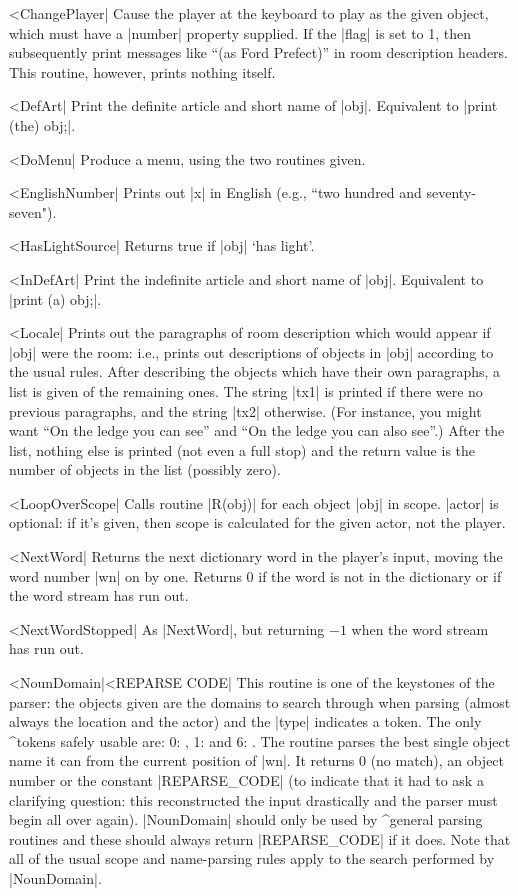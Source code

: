 ^^|ChangePlayer|
Cause the player at the keyboard to
play as the given object, which must have a |number| property supplied.  If
the |flag| is set to 1, then subsequently print messages like ``(as Ford
Prefect)'' in room description headers.  This routine, however, prints nothing
itself.

^^|DefArt|
Print the definite article and short name of
|obj|.  Equivalent to |print (the) obj;|.

^^|DoMenu|
Produce a menu, using the two routines given.

^^|EnglishNumber|
Prints out |x| in English (e.g., ``two hundred and seventy-seven").

^^|HasLightSource|
Returns true if |obj| `has light'.

^^|InDefArt|
Print the indefinite article and short name
of |obj|.  Equivalent to |print (a) obj;|.

^^|Locale|
Prints out the paragraphs of room description which would appear
if |obj| were the room: i.e., prints out descriptions of objects
in |obj| according to the usual rules.  After describing the
objects which have their own paragraphs, a list is given of
the remaining ones.  The string |tx1| is printed if there were
no previous paragraphs, and the string |tx2| otherwise.
(For instance, you might want ``On the ledge you can see''
and ``On the ledge you can also see''.)  After the list, nothing
else is printed (not even a full stop) and the return value is
the number of objects in the list (possibly zero).

^^|LoopOverScope|
Calls routine |R(obj)| for each object |obj| in scope.  |actor|
is optional: if it's given, then scope is calculated for the
given actor, not the player.

^^|NextWord|
Returns the next dictionary word in the player's
input, moving the word number |wn| on by one.  Returns 0
if the word is not in the dictionary or if the word stream has
run out.

^^|NextWordStopped|
As |NextWord|, but returning $-1$ when the word stream has run out.

^^|NounDomain|^^|REPARSE CODE|
This routine is one of the keystones of the parser: the objects
given are the domains to search through when parsing (almost
always the location and the actor) and the |type| indicates a
token.  The only ^{tokens} safely usable are: 0: ,
1:  and 6: .  The routine parses
the best single object name it can from the current position
of |wn|.  It returns 0 (no match), an object number or
the constant |REPARSE_CODE| (to indicate that it had to ask
a clarifying question: this reconstructed the input drastically
and the parser must begin all over again).  |NounDomain| should
only be used by ^{general parsing routines} and these should
always return |REPARSE_CODE| if it does.  Note that all of the
usual scope and name-parsing rules apply to the search performed
by |NounDomain|.

